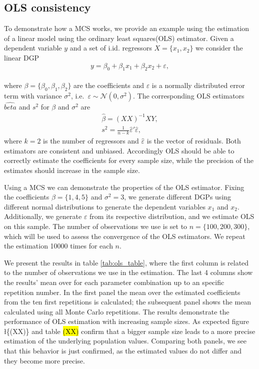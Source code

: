 \documentclass[10pt,a4paper]{article}
\begin{document}
 \hypertarget{ols-consistency}{%
 \subsection{OLS consistency}\label{ols-consistency}}

 To demonstrate how a MCS works, we provide an example using the
 estimation of a linear model using the ordinary least squares(OLS)
 estimator. Given a dependent variable \(y\) and a set of i.id.
 regressors \(X = \{x_1, x_2\}\) we consider the linear DGP
 \begin{equation}
     \label{eq_DGP}
     y = \beta_0 + \beta_1 x_1 + \beta_2 x_2 + \varepsilon,
 \end{equation}\\
 where \(\beta = \{\beta_0, \beta_1, \beta_2\}\) are the coefficients
 and \(\varepsilon\) is a normally distributed error term with variance
 \(\sigma^2\), i.e.~\(\varepsilon \sim \mathcal{N}(0,\sigma^2)\). The
 corresponding OLS estimators \(\hat{beta}\) and \(s^2\) for \(\beta\)
 and \(\sigma^2\) are \begin{align}
     \hat{\beta} = (XX)^{-1} XY,\\
     s^2 =   \frac{1}{n-k} \hat{\varepsilon}' \hat{\varepsilon},
 \end{align} where \(k = 2\) is the number of regressors and
 \(\hat{\varepsilon}\) is the vector of residuals. Both estimators are
 consistent and unbiased. Accordingly OLS should be able to correctly
 estimate the coefficients for every sample size, while the precision of
 the estimates should increase in the sample size.

 \noindent Using a MCS we can demonstrate the properties of the OLS
 estimator. Fixing the coefficients \(\beta = \{1, 4, 5\}\) and
 \(\sigma^2 = 3\), we generate different DGPs using different normal
 distributions to generate the dependent variables \(x_1\) and \(x_2\).
 Additionally, we generate \(\varepsilon\) from its respective
 distribution, and we estimate OLS on this sample. The number of
 observations we use is set to \(n = \{100, 200, 300\}\), which will be
 used to assess the convergence of the OLS estimators. We repeat the
 estimation 10000 times for each \(n\).

 We present the results in table \ref{tab:ols_table}, where the first
 column is related to the number of observations we use in the
 estimation. The last 4 columns show the results' mean over for each
 parameter combination up to an specific repetition number. In the first
 panel the mean over the estimated coefficients from the ten first
 repetitions is calculated; the subsequent panel shows the mean
 calculated using all Monte Carlo repetitions. The results demonstrate
 the performance of OLS estimation with increasing sample sizes. As
 expected figure \l\{(XX)\} and table \hl{(XX)} confirm that a bigger
 sample size leads to a more precise estimation of the underlying
 population values. Comparing both panels, we see that this behavior is
 just confirmed, as the estimated values do not differ and they become
 more precise.
\end{document}
